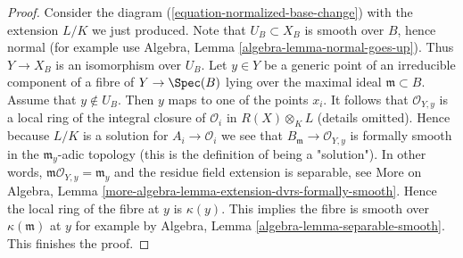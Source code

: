 \begin{proof}
\medskip\noindent
Consider the diagram (\ref{equation-normalized-base-change})
with the extension $L/K$ we just produced. Note that $U_B \subset X_B$
is smooth over $B$, hence normal (for example use
Algebra, Lemma \ref{algebra-lemma-normal-goes-up}).
Thus $Y \to X_B$ is an isomorphism over $U_B$.
Let $y \in Y$ be a generic point of an irreducible
component of a fibre of $Y \to \Spec(B)$ lying over the maximal
ideal $\mathfrak m \subset B$. Assume that $y \not \in U_B$.
Then $y$ maps to one of the points $x_i$. It follows that
$\mathcal{O}_{Y, y}$ is a local ring of the integral closure
of $\mathcal{O}_i$ in $R(X) \otimes_K L$ (details omitted).
Hence because $L/K$ is a solution for
$A_i \to \mathcal{O}_i$ we see that
$B_\mathfrak m \to \mathcal{O}_{Y, y}$ is formally smooth
in the $\mathfrak m_y$-adic topology
(this is the definition of being a "solution").
In other words, $\mathfrak m\mathcal{O}_{Y, y} = \mathfrak m_y$
and the residue field extension is separable, see
More on Algebra, Lemma \ref{more-algebra-lemma-extension-dvrs-formally-smooth}.
Hence the local ring
of the fibre at $y$ is $\kappa(y)$.
This implies the fibre is smooth over $\kappa(\mathfrak m)$
at $y$ for example by Algebra, Lemma \ref{algebra-lemma-separable-smooth}.
This finishes the proof.
\end{proof}

